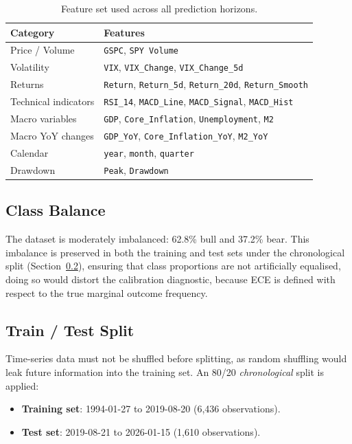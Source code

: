 \documentclass[12pt]{article}
\begin{document}
\begin{table}[H]
\centering
\caption{Feature set used across all prediction horizons.}
\label{tab:features}
\small
\begin{tabular}{ll}
\toprule
Category & Features \\
\midrule
Price / Volume & \texttt{GSPC}, \texttt{SPY Volume} \\
Volatility & \texttt{VIX}, \texttt{VIX\_Change}, \texttt{VIX\_Change\_5d} \\
Returns & \texttt{Return}, \texttt{Return\_5d}, \texttt{Return\_20d}, \texttt{Return\_Smooth} \\
Technical indicators & \texttt{RSI\_14}, \texttt{MACD\_Line}, \texttt{MACD\_Signal}, \texttt{MACD\_Hist} \\
Macro variables & \texttt{GDP}, \texttt{Core\_Inflation}, \texttt{Unemployment}, \texttt{M2} \\
Macro YoY changes & \texttt{GDP\_YoY}, \texttt{Core\_Inflation\_YoY}, \texttt{M2\_YoY} \\
Calendar & \texttt{year}, \texttt{month}, \texttt{quarter} \\
Drawdown & \texttt{Peak}, \texttt{Drawdown} \\
\bottomrule
\end{tabular}
\end{table}

\subsection{Class Balance}

The dataset is moderately imbalanced: 62.8\% bull and 37.2\% bear.
This imbalance is preserved in both the training and test sets under the
chronological split (Section~\ref{sec:split}), ensuring that class proportions
are not artificially equalised, doing so would distort the calibration
diagnostic, because ECE is defined with respect to the true marginal outcome
frequency.

\subsection{Train / Test Split}
\label{sec:split}

Time-series data must not be shuffled before splitting, as random
shuffling would leak future information into the training set.
An 80/20 \emph{chronological} split is applied:

\begin{itemize}[leftmargin=1.5em,itemsep=2pt,topsep=4pt]
  \item \textbf{Training set}: 1994-01-27 to 2019-08-20 (6,436 observations).
  \item \textbf{Test set}: 2019-08-21 to 2026-01-15 (1,610 observations).
\end{itemize}
\end{document}
